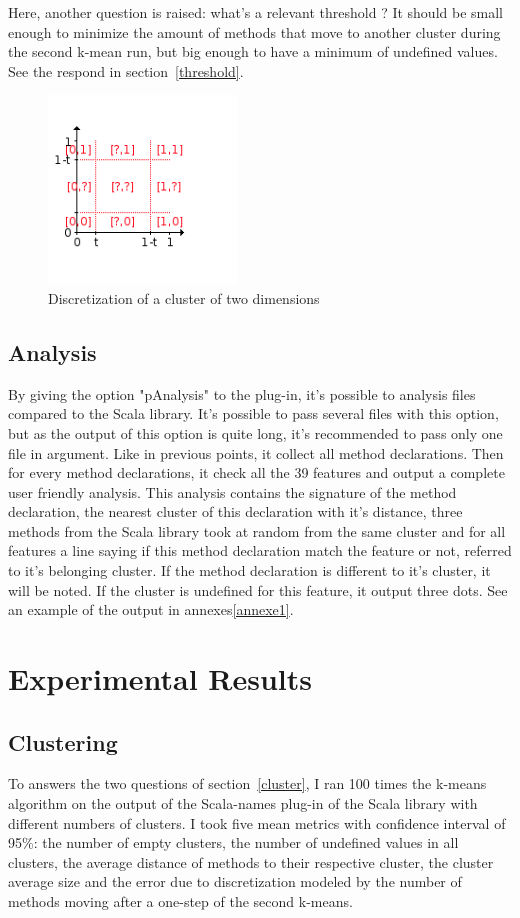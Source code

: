 \documentclass[12pt]{article}
\begin{document}
Here, another question is raised: what's a relevant threshold ? It should be small enough to minimize the amount of methods that move to another cluster during the second k-mean run, but big enough to have a minimum of undefined values. See the respond in section~\ref{threshold}.
\begin{figure}[tbc]
\centering
\includegraphics[width=5cm]{images/discrete.png}
\caption{Discretization of a cluster of two dimensions}
\label{discrete}
\end{figure}
\subsection{Analysis}
\label{analysis}
By giving the option "pAnalysis" to the plug-in, it's possible to analysis files compared to the Scala library. It's possible to pass several files with this option, but as the output of this option is quite long, it's recommended to pass only one file in argument. Like in previous points, it collect all method declarations. Then for every method declarations, it check all the 39 features and output a complete user friendly analysis. This analysis contains the signature of the method declaration, the nearest cluster of this declaration with it's distance, three methods from the Scala library took at random from the same cluster and for all features a line saying if this method declaration match the feature or not, referred to it's belonging cluster. If the method declaration is different to it's cluster, it will be noted. If the cluster is undefined for this feature, it output three dots. See an example of the output in annexes\ref{annexe1}.
\section {Experimental Results}

\subsection {Clustering}
\label{cluster:exp}
To answers the two questions of section~\ref{cluster}, I ran 100 times the k-means algorithm on the output of the Scala-names plug-in of the Scala library with different numbers of clusters. I took five mean metrics with confidence interval of 95\%: the number of empty clusters, the number of undefined values in all clusters, the average distance of methods to their respective cluster, the cluster average size and the error due to discretization modeled by the number of methods moving after a one-step of the second k-means. 
\end{document}
